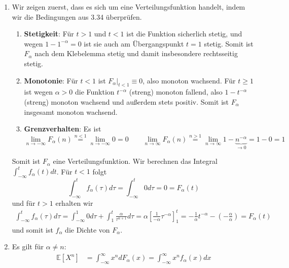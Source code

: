 \documentclass{article}
\def\to{\ensuremath{\rightarrow}} %
\begin{document}
\begin{enumerate}[label=(\alph*)]
	\item Wir zeigen zuerst, dass es sich um eine Verteilungsfunktion handelt, indem wir die Bedingungen aus 3.34 überprüfen.
	      \begin{enumerate}
		      \item \textbf{Stetigkeit}: Für $t > 1$ und $t < 1$ ist die Funktion sicherlich stetig, und wegen $1 - 1^{-\alpha}=0$ ist sie auch am Übergangspunkt $t = 1$ stetig. Somit ist $F_\alpha$ nach dem Klebelemma stetig und damit insbesondere rechtsseitig stetig.
		      \item \textbf{Monotonie}: Für $t < 1$ ist $F_\alpha|_{t < 1} \equiv 0$, also monoton wachsend. Für $t \geq 1$ ist wegen $\alpha > 0$ die Funktion $t^{-\alpha}$ (streng) monoton fallend, also $1 - t^{-\alpha}$ (streng) monoton wachsend und außerdem stets positiv. Somit ist $F_\alpha$ insgesamt monoton wachsend.
		      \item \textbf{Grenzverhalten}: Es ist
		            \begin{equation*}
			            \lim_{n \to -\infty} F_\alpha(n) \overset{n < 1}{=} \lim_{n \to -\infty} 0 = 0 \qquad \lim_{n \to \infty} F_\alpha(n) \overset{n > 1}{=} \lim_{n \to \infty} 1 - \underbrace{n^{-\alpha}}_{\to 0} = 1 - 0 = 1
		            \end{equation*}
	      \end{enumerate}
	      Somit ist $F_\alpha$ eine Verteilungsfunktion. Wir berechnen das Integral $\int_{-\infty}^{t} f_\alpha(t) dt$. Für $t < 1$ folgt
	      \begin{equation*}
		      \int_{-\infty}^{t} f_\alpha(\tau) d\tau = \int_{-\infty}^{t} 0 d\tau = 0 = F_\alpha(t)
	      \end{equation*}
	      und für $t > 1$ erhalten wir
	      \begin{align*}
		      \int_{-\infty}^{t} f_\alpha(\tau) d\tau = \int_{-\infty}^{1} 0 d\tau + \int_{1}^{t} \frac{\alpha}{\tau^{\alpha + 1}} d\tau = \alpha \left[\frac{1}{-\alpha} \tau^{-\alpha}\right]_1^t = - \frac{1}{\alpha} t^{-\alpha} - \left( - \frac{\alpha}{\alpha} \right) = F_\alpha(t)
	      \end{align*}
	      und somit ist $f_\alpha$ die Dichte von $F_\alpha$.
	\item Es gilt für $\alpha \neq n$:
	      \begin{align*}
		      \mathds{E}[X^n] & = \int_{-\infty}^{\infty} x^n dF_\alpha(x) = \int_{-\infty}^{\infty} x^n f_\alpha(x) dx                                                                                    \\

\end{align*}
\end{enumerate}
\end{document}
